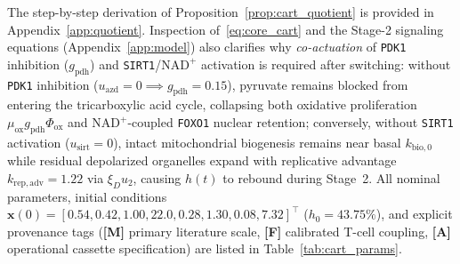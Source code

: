 \documentclass[11pt]{article}
\theoremstyle{plain}
\theoremstyle{remark}
\begin{document}
The step-by-step derivation of Proposition~\ref{prop:cart_quotient} is provided in Appendix~\ref{app:quotient}. Inspection of~\eqref{eq:core_cart} and the Stage-2 signaling equations (Appendix~\ref{app:model}) also clarifies why \emph{co-actuation} of \texttt{PDK1} inhibition ($g_{\mathrm{pdh}}$) and \texttt{SIRT1}/$\text{NAD}^+$ activation is required after switching: without \texttt{PDK1} inhibition ($u_{\mathrm{azd}} = 0 \implies g_{\mathrm{pdh}} = 0.15$), pyruvate remains blocked from entering the tricarboxylic acid cycle, collapsing both oxidative proliferation $\mu_{\mathrm{ox}} g_{\mathrm{pdh}} \Phi_{\mathrm{ox}}$ and $\text{NAD}^+$-coupled \texttt{FOXO1} nuclear retention; conversely, without \texttt{SIRT1} activation ($u_{\mathrm{sirt}} = 0$), intact mitochondrial biogenesis remains near basal $k_{\mathrm{bio},0}$ while residual depolarized organelles expand with replicative advantage $k_{\mathrm{rep,adv}} = 1.22$ via $\xi_D u_2$, causing $h(t)$ to rebound during Stage~2. All nominal parameters, initial conditions $\mathbf{x}(0) = [0.54, 0.42, 1.00, 22.0, 0.28, 1.30, 0.08, 7.32]^\top$ ($h_0 = 43.75\%$), and explicit provenance tags (\textbf{[M]} primary literature scale, \textbf{[F]} calibrated T-cell coupling, \textbf{[A]} operational cassette specification) are listed in Table~\ref{tab:cart_params}.
\end{document}
